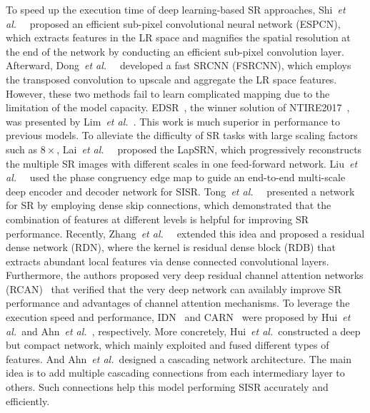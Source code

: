 \documentclass[preprint]{elsarticle}
\newcommand{\etal}{\textit{et al.~}}
\begin{document}
To speed up the execution time of deep learning-based SR approaches, Shi~\etal~\cite{ESPCN} proposed an efficient sub-pixel convolutional neural network (ESPCN), which extracts features in the LR space and magnifies the spatial resolution at the end of the network by conducting an efficient sub-pixel convolution layer. Afterward, Dong~\etal~\cite{FSRCNN} developed a fast SRCNN (FSRCNN), which employs the transposed convolution to upscale and aggregate the LR space features. However, these two methods fail to learn complicated mapping due to the limitation of the model capacity. EDSR~\cite{EDSR}, the winner solution of NTIRE2017~\cite{NTIRE2017}, was presented by Lim~\etal. This work is much superior in performance to previous models. To alleviate the difficulty of SR tasks with large scaling factors such as $8 \times$, Lai~\etal~\cite{LapSRN} proposed the LapSRN, which progressively reconstructs the multiple SR images with different scales in one feed-forward network. Liu~\etal~\cite{MSDEPC_IS19} used the phase congruency edge map to guide an end-to-end multi-scale deep encoder and decoder network for SISR. Tong~\etal~\cite{SRDenseNet} presented a network for SR by employing dense skip connections, which demonstrated that the combination of features at different levels is helpful for improving SR performance. Recently, Zhang~\etal~\cite{RDN} extended this idea and proposed a residual dense network (RDN), where the kernel is residual dense block (RDB) that extracts abundant local features via dense connected convolutional layers. Furthermore, the authors proposed very deep residual channel attention networks (RCAN)~\cite{RCAN} that verified that the very deep network can availably improve SR performance and advantages of channel attention mechanisms. To leverage the execution speed and performance, IDN~\cite{IDN} and CARN~\cite{CARN} were proposed by Hui~\etal and Ahn~\etal, respectively. More concretely, Hui~\etal constructed a deep but compact network, which mainly exploited and fused different types of features. And Ahn~\etal designed a cascading network architecture. The main idea is to add multiple cascading connections from each intermediary layer to others. Such connections help this model performing SISR accurately and efficiently.
\end{document}
